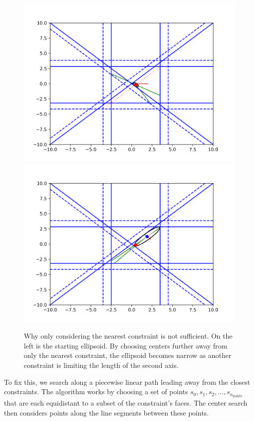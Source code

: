 \begin{figure}[ht]
    \centering
    \includegraphics[scale=0.4]{images/line_1.png}
    \includegraphics[scale=0.4]{images/line_2.png}
    \caption[Why only considering the nearest constraint is not sufficient. ]
        {Why only considering the nearest constraint is not sufficient.   On the left is the starting ellipsoid.
    	By choosing centers further away from only the nearest constraint, the ellipsoid becomes narrow as another constraint is limiting the length of the second axis.
	}
    \label{first_line_search}
\end{figure}

To fix this, we search along a piecewise linear path leading away from the closest constraints.   
The algorithm works by choosing a set of points $s_0, s_1, s_2, \ldots, s_{n_{\text{points}}}$
that are each equidistant to a subset of the constraint's faces.
The center search then considers points along the line segments between these points.


